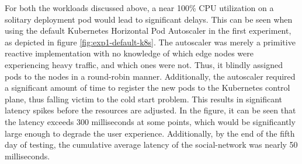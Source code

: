 For both the workloads discussed above, a near 100\% CPU utilization on a solitary deployment pod would lead to significant delays. This can be seen when using the default Kubernetes Horizontal Pod Autoscaler in the first experiment, as depicted in figure \ref{fig:exp1-default-k8s}. The autoscaler was merely a primitive reactive implementation with no knowledge of which edge nodes were experiencing heavy traffic, and which ones were not. Thus, it blindly assigned pods to the nodes in a round-robin manner. Additionally, the autoscaler required a significant amount of time to register the new pods to the Kubernetes control plane, thus falling victim to the cold start problem. This results in significant latency spikes before the resources are adjusted. In the figure, it can be seen that the latency exceeds 300 milliseconds at some points, which would be significantly large enough to degrade the user experience. Additionally, by the end of the fifth day of testing, the cumulative average latency of the social-network was nearly 50 milliseconds.\par

\begin{center}
\begin{minipage}{\linewidth}
    \label{fig:exp2-default-k8s}
\end{minipage}
\end{center}


